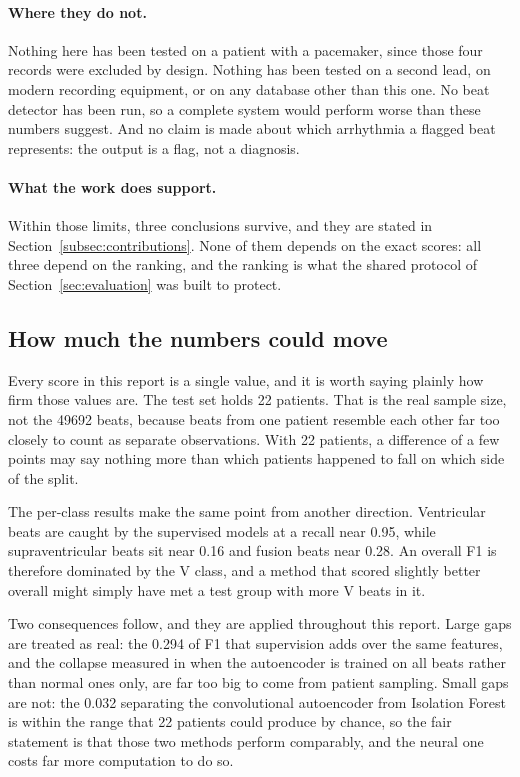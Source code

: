 \documentclass[a4paper, 12pt]{article}
\begin{document}
\paragraph{Where they do not.} Nothing here has been tested on a patient with a
pacemaker, since those four records were excluded by design. Nothing has been
tested on a second lead, on modern recording equipment, or on any database other
than this one. No beat detector has been run, so a complete system would perform
worse than these numbers suggest. And no claim is made about which arrhythmia a
flagged beat represents: the output is a flag, not a diagnosis.

\paragraph{What the work does support.} Within those limits, three conclusions
survive, and they are stated in Section~\ref{subsec:contributions}. None of them
depends on the exact scores: all three depend on the ranking, and the ranking is
what the shared protocol of Section~\ref{sec:evaluation} was built to protect.

\subsection{How much the numbers could move} \label{subsec:limits-numbers}

Every score in this report is a single value, and it is worth saying plainly how
firm those values are. The test set holds 22 patients. That is the real sample
size, not the \num{49692} beats, because beats from one patient resemble each
other far too closely to count as separate observations. With 22 patients, a
difference of a few points may say nothing more than which patients happened to
fall on which side of the split.

The per-class results make the same point from another direction. Ventricular
beats are caught by the supervised models at a recall near \num{0.95}, while
supraventricular beats sit near \num{0.16} and fusion beats near \num{0.28}. An
overall F1 is therefore dominated by the V class, and a method that scored slightly
better overall might simply have met a test group with more V beats in it.

Two consequences follow, and they are applied throughout this report. Large gaps
are treated as real: the \num{0.294} of F1 that supervision adds over the same
features, and the collapse measured in  when the autoencoder is
trained on all beats rather than normal ones only, are far too big to come from
patient sampling. Small gaps are not: the \num{0.032} separating the convolutional
autoencoder from Isolation Forest is within the range that 22 patients could
produce by chance, so the fair statement is that those two methods perform
comparably, and the neural one costs far more computation to do so.
\end{document}
